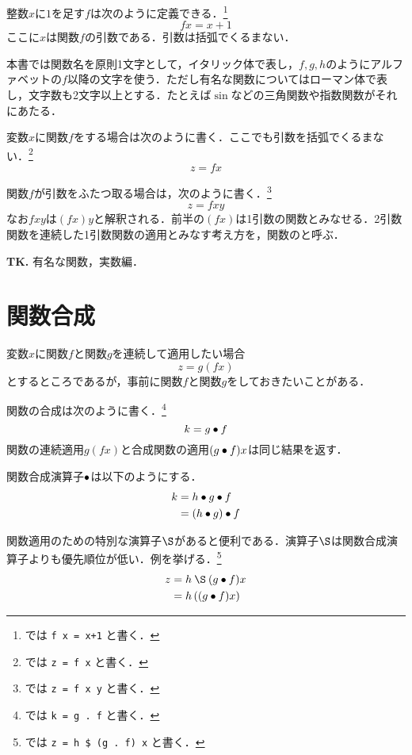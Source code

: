 \documentclass[platex,a5paper,twoside,fleqn,draft]{jsbook}
\newcommand{\keyword}[1]{\textgt{\textbf{#1}}}
\newcommand{\tobewritten}[1]{\begin{screen}\textbf{TK.} {#1}\end{screen}}
\begin{document}
整数$x$に$1$を足す\keyword{関数}$f$は次のように定義できる．\footnote{\haskell では \verb|f x = x+1| と書く．}
\begin{equation}
fx=x+1
\end{equation}
ここに$x$は関数$f$の引数である．引数は括弧でくるまない．

本書では関数名を原則1文字として，イタリック体で表し，$f,g,h$のようにアルファベットの$f$以降の文字を使う．ただし有名な関数についてはローマン体で表し，文字数も2文字以上とする．たとえば$\sin$などの三角関数や指数関数がそれにあたる．

変数$x$に関数$f$を\keyword{適用}する場合は次のように書く．ここでも引数を括弧でくるまない．\footnote{\haskell では \verb|z = f x| と書く．}
\begin{equation}
z=fx
\end{equation}

関数$f$が引数をふたつ取る場合は，次のように書く．\footnote{\haskell では \verb|z = f x y| と書く．}
\begin{equation}
z=fxy
\end{equation}
なお$fxy$は$(fx)y$と解釈される．前半の$(fx)$は1引数の関数とみなせる．2引数関数を連続した1引数関数の適用とみなす考え方を，関数の\keyword{カリー化}と呼ぶ．

\tobewritten{有名な関数，実数編．}

\section{関数合成}

変数$x$に関数$f$と関数$g$を連続して適用したい場合
\begin{equation}
z=g(fx)
\end{equation}
とするところであるが，事前に関数$f$と関数$g$を\keyword{合成}しておきたいことがある．

関数の合成は次のように書く．\footnote{\haskell では \verb|k = g . f| と書く．}
\begin{equation}
k=g\mathbin{\bullet} f
\end{equation}
関数の連続適用$g(fx)$と合成関数の適用$(g\mathbin{\bullet} f)x$は同じ結果を返す．

関数合成演算子$\mathbin{\bullet}$は以下のように\keyword{左結合}する．
\begin{align}
k&=h\mathbin{\bullet} g\mathbin{\bullet} f\\
&=\left(h\mathbin{\bullet} g\right)\mathbin{\bullet} f\\
\end{align}

関数適用のための特別な演算子$\mathApply$があると便利である．演算子$\mathApply$は関数合成演算子よりも優先順位が低い．例を挙げる．\footnote{\haskell では \verb|z = h $ (g . f) x| と書く．}
\begin{align}
z&=h\mathApply(g\mathCompose f)x\\
&=h\left((g\mathCompose f)x\right)
\end{align}
\end{document}
